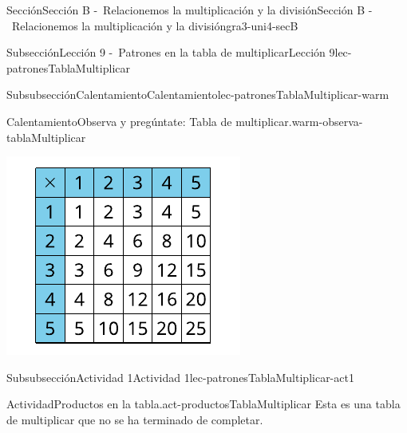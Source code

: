 \documentclass[twoside,10pt,]{article}
\begin{document}
\begin{sectionptx}{Sección}{Sección B -~Relacionemos la multiplicación y la división}{}{Sección B -~Relacionemos la multiplicación y la división}{}{}{gra3-uni4-secB}
\begin{subsectionptx}{Subsección}{Lección 9 -~Patrones en la tabla de multiplicar}{}{Lección 9}{}{}{lec-patronesTablaMultiplicar}
\begin{subsubsectionptx}{Subsubsección}{Calentamiento}{}{Calentamiento}{}{}{lec-patronesTablaMultiplicar-warm}
\begin{exploration}{Calentamiento}{Observa y pregúntate: Tabla de multiplicar.}{warm-observa-tablaMultiplicar}
\begin{image}{0}{1}{0}{}
\includegraphics[width=\linewidth]{external/svg-source/tikz-file-152968-scale13.pdf}
\end{image}%
\end{exploration}%
\end{subsubsectionptx}
%
%
\typeout{************************************************}
\typeout{************************************************}
%
\begin{subsubsectionptx}{Subsubsección}{Actividad 1}{}{Actividad 1}{}{}{lec-patronesTablaMultiplicar-act1}
\begin{activity}{Actividad}{Productos en la tabla.}{act-productosTablaMultiplicar}%
Esta es una tabla de multiplicar que no se ha terminado de completar.%
\begin{image}{0}{1}{0}{}%

\end{image}
\end{activity}
\end{subsubsectionptx}
\end{subsectionptx}
\end{sectionptx}
\end{document}
